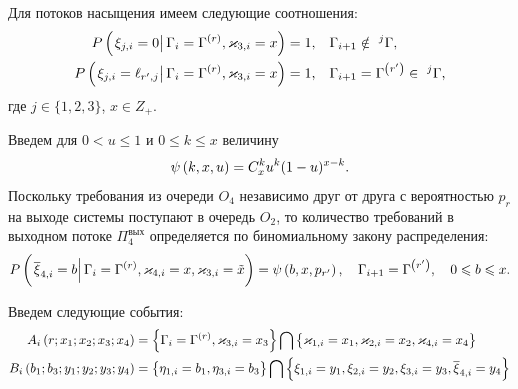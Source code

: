\documentclass[a4paper,12pt,russian]{extarticle}
\newcommand{\G}{\Gamma}
\renewcommand{\P}[2]{P\br{\left. #1 \right| #2}}
\newcommand{\ga}[1]{\Gamma^{\left( #1 \right)} }
\begin{document}
Для потоков насыщения имеем следующие соотношения:
\begin{align}
\P{\xi_{j,i} = 0}{\G_i=\ga{r}, \vk_{3,i} = x} = 1, &\quad \G_{i+1} \notin~^j\G,\\
\P{\xi_{j,i} = \ell_{r',j}}{\G_i=\ga{r}, \vk_{3,i} = x} = 1, &\quad \G_{i+1}=\ga{r'}\in~^j\G,
\end{align}
где $j\in \{1, 2, 3\}$, $x \in Z_+$.

Введем для $0 < u \leqslant 1$ и $0 \leqslant k \leqslant x$ величину
\begin{equation}
\psi\left(k,x,u\right) = C_x^k u^k (1-u)^{x-k}.
\end{equation}
Поскольку требования из очереди $O_4$ независимо друг от друга с вероятностью $p_r$ на выходе системы поступают в очередь $O_2$, то количество требований в выходном потоке $\Pi_4^{\mathrm{\text{вых}}}$ определяется по биномиальному закону распределения:
\begin{equation}
\P{\overline{\xi}_{4,i} = b}{ \G_i = \ga{r}, \vk_{4,i}=x, \vk_{3,i}=\tilde{x}}=\psi\br{b,x,p_{r'}}, \quad \G_{i+1}=\ga{r'}, \quad 0 \leqslant b \leqslant x.
\end{equation}


Введем следующие события:
\begin{align}
A_i\br{r;x_1;x_2;x_3;x_4} &= \brrr{\G_i=\ga{r},\vk_{3,i}=x_3}\bigcap \brrr{\vk_{1,i}=x_1,\vk_{2,i}=x_2,\vk_{4,i}=x_4}\\
B_i\br{b_1;b_3;y_1;y_2;y_3;y_4} &= \brrr{\eta_{1,i}=b_1,\eta_{3,i}=b_3} \bigcap \brrr{\xi_{1,i}=y_1,\xi_{2,i}=y_2,\xi_{3,i}=y_3,\overline{\xi}_{4,i}=y_4}
\end{align}
\end{document}
